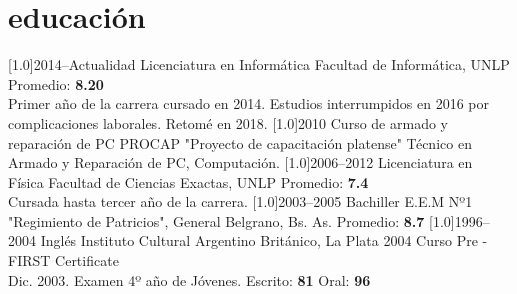 \documentclass[espanol, print]{cv-style}     %
\begin{document}
\section{educación}
  \vspace{-0.2cm}
\begin{entrylist}
\entry
{\scalebox{.8}[1.0]{2014--Actualidad}}
{Licenciatura en Informática \small {}}
{Facultad de Informática, UNLP}
{Promedio: \textbf{8.20}\\
{\small Primer año de la carrera cursado en 2014. Estudios interrumpidos en 2016 por complicaciones laborales. Retomé en 2018.
}}%
\entry
{\scalebox{.8}[1.0]{2010}}
{Curso de armado y reparación de PC}
{PROCAP "Proyecto de capacitación platense"}
{\small{Técnico en Armado y Reparación de PC, Computación.
}}
\entry
{\scalebox{.8}[1.0]{2006--2012}}
{Licenciatura en Física \small {}}
{Facultad de Ciencias Exactas, UNLP}
{\small Promedio: \textbf{7.4}\\
{Cursada hasta tercer año de la carrera.
}}
\entry
{\scalebox{.8}[1.0]{2003--2005}}
{Bachiller }
{{E.E.M Nº1 "Regimiento de Patricios", General Belgrano, Bs. As.}}
{\small Promedio: \textbf{8.7}
}
\entry
{\scalebox{.8}[1.0]{1996--2004}}
{Inglés}
{{Instituto Cultural Argentino Británico, La Plata}}
{\small
2004 Curso Pre - FIRST Certificate \\
Dic. 2003. Examen 4º año de Jóvenes. Escrito: \textbf{81} Oral: \textbf{96}
}

\end{entrylist}
\vspace{-0.3cm}
\end{document}
